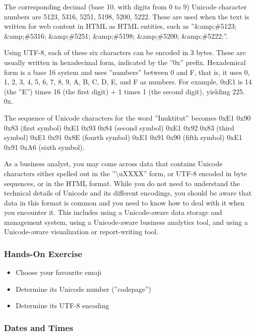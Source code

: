 The corresponding decimal (base 10, with digits from 0 to 9) Unicode character numbers are 5123, 5316, 5251, 5198, 5200, 5222. These are used when the text is written for web content in HTML as HTML entities, such as ''\&amp;\#5123; \&amp;\#5316; \&amp;\#5251; \&amp;\#5198; \&amp;\#5200; \&amp;\#5222;''.

Using UTF-8, each of these six characters can be encoded in 3 bytes. These are usually written in hexadecimal form, indicated by the ''0x'' prefix. Hexademical form is a base 16 system and uses ''numbers'' between 0 and F, that is, it uses 0, 1, 2, 3, 4, 5, 6, 7, 8, 9, A, B, C, D, E, and F as numbers. For example, 0xE1 is 14 (the ''E'') times 16 (the first digit) + 1 times 1 (the second digit), yielding 225. 0x. 

The sequence of Unicode characters for the word ''Inuktitut'' becomes 0xE1 0x90 0x83 (first symbol) 0xE1 0x93 0x84 (second symbol) 0xE1 0x92 0x83 (third symbol) 0xE1 0x91 0x8E (fourth symbol) 0xE1 0x91 0x90 (fifth symbol) 0xE1 0x91 0xA6 (sixth symbol). 

As a business analyst, you may come across data that contains Unicode characters either spelled out in the ''\textbackslash uXXXX'' form, or UTF-8 encoded in byte sequences, or in the HTML format. While you do not need to understand the technical details of Unicode and its different encodings, you should be aware that data in this format is common and you need to know how to deal with it when you encounter it. This includes using a Unicode-aware data storage and management system, using a Unicode-aware business analytics tool, and using a Unicode-aware visualization or report-writing tool.

\begin{tcolorbox}[colback=code]
\subsubsection*{Hands-On Exercise}
\begin{itemize}
	\item Choose your favourite emoji
	\item Determine its Unicode number (''codepage'')
	\item Determine its UTF-8 encoding
\end{itemize}
\end{tcolorbox}

\subsubsection*{Dates and Times}

